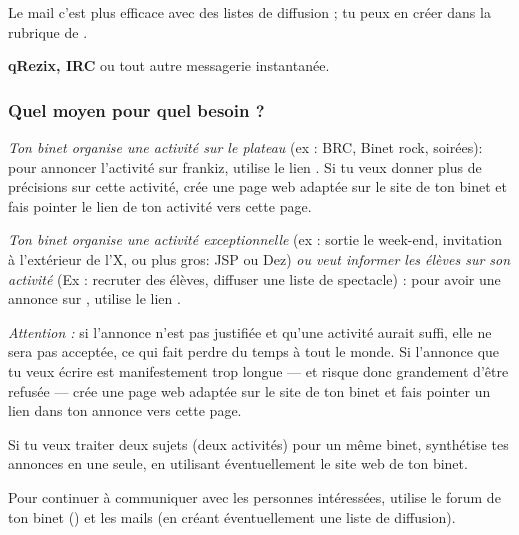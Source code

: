   Le mail c'est plus efficace avec des listes de diffusion ; tu peux en créer dans la rubrique  de .

\textbf{qRezix, IRC} ou tout autre messagerie instantanée.

\subsubsection{Quel moyen pour quel besoin ?}
\emph{Ton binet organise une activité sur le plateau} (ex : BRC,
Binet rock, soirées): pour annoncer l'activité sur frankiz, utilise
le lien . Si tu veux donner plus de
précisions sur cette activité, crée une page web adaptée sur le site
de ton binet et fais pointer le lien de ton activité vers cette
page.

\emph{Ton binet organise une activité exceptionnelle} (ex : sortie le week-end, invitation à l'extérieur de l'X, ou plus gros: JSP ou Dez) 
\emph{ou veut informer les élèves sur son activité} (Ex : recruter des élèves, diffuser une liste de spectacle) : pour avoir une annonce sur \fkz, utilise le lien .

\emph{Attention :} si l'annonce n'est pas justifiée et qu'une activité aurait suffi, elle ne sera pas acceptée, ce qui fait perdre du temps à tout le
monde. Si l'annonce que tu veux écrire est manifestement trop longue --- et risque donc grandement d'être refusée --- crée une page web adaptée sur le
site de ton binet et fais pointer un lien dans ton annonce vers cette page.

Si tu veux traiter deux sujets (deux activités) pour un même binet,
synthétise tes annonces en une seule, en utilisant éventuellement le
site web de ton binet.

Pour continuer à communiquer avec les personnes intéressées, utilise
le forum de ton binet () et les mails
(en créant éventuellement une liste de diffusion).
